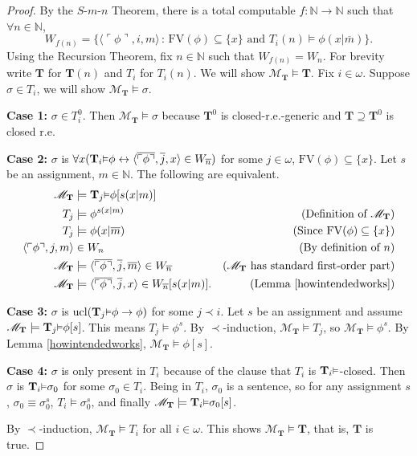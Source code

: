 \documentclass[reqno]{article}
\theoremstyle{definition}
\def\N{\mathbb{N}}
\def\M{\mathscr{M}}
\def\T{\mathbf{T}}
\def\FV{\mathrm{FV}}
\renewcommand{\Pr}[1]{\T_{#1}\mbox{\small${\vDash}$}}
\newcommand{\ucl}[1]{\mathrm{ucl}(#1)}
\newcommand{\case}[1]{\textbf{Case #1:}}
\begin{document}
\begin{proof}
By the $S$-$m$-$n$ Theorem, there is a total computable $f:\N\to\N$ such that $\forall n\in\N$,
\[
W_{f(n)}=\{\langle\ulcorner\phi\urcorner,i,m\rangle\,:\,
\mbox{$\FV(\phi)\subseteq\{x\}$ and $T_i(n)\models \phi(x|\overline m)$}\}.\]
Using the Recursion Theorem, fix $n\in\N$ such that
$W_{f(n)}=W_n$.
%
%
For brevity write $\T$ for $\T(n)$ and $T_i$ for $T_i(n)$.
We will show $\M_\T\models\T$.
Fix $i\in \omega$.
%
%
Suppose $\sigma\in T_i$, we will show $\M_\T\models\sigma$.


\item
\case1
$\sigma\in T^0_i$.
Then $\M_\T\models\sigma$ because $\T^0$ is closed-r.e.-generic and
$\T\supseteq\T^0$ is closed r.e.

\item
\case2
$\sigma$ is $\forall x(\Pr i\phi\leftrightarrow
\langle\overline{\ulcorner\phi\urcorner},\overline j,x\rangle\in W_{\overline n})$
for some $j\in\omega$, $\FV(\phi)\subseteq\{x\}$.
Let $s$ be an assignment, $m\in\N$.
The following are equivalent.
\begin{align*}
\M_{\T} &\models \Pr{j}\phi[s(x|m)]\\
T_j &\models \phi^{s(x|m)}
 &\mbox{(Definition of $\M_\T$)}\\
T_j &\models \phi(x|\overline m)
 &\mbox{(Since $\FV(\phi)\subseteq\{x\}$)}\\
\langle \ulcorner\phi\urcorner,j,m\rangle &\in W_n
 &\mbox{(By definition of $n$)}\\
\M_{\T} &\models \langle\overline{\ulcorner\phi\urcorner},\overline j,\overline m\rangle\in W_{\overline n}
 &\mbox{($\M_{\T}$ has standard first-order part)}\\
\M_{\T} &\models \langle\overline{\ulcorner\phi\urcorner},\overline j,x\rangle\in W_{\overline n}[s(x|m)].
 &\mbox{(Lemma \ref{howintendedworks})}
\end{align*}

\item
\case3
$\sigma$ is $\ucl{\Pr j\phi\rightarrow\phi}$ for some $j\prec i$.
Let $s$ be an assignment and assume $\M_\T\models\Pr j\phi[s]$.
This means $T_j\models\phi^s$.
By $\prec$-induction, 
$\M_\T\models T_j$,
so
$\M_\T\models \phi^s$.  By Lemma \ref{howintendedworks},
$\M_\T\models \phi[s]$.

\item
\case4
$\sigma$ is only present in $T_i$ because of the clause that $T_i$
is $\Pr i$-closed.
Then $\sigma$ is $\Pr i\sigma_0$ for some $\sigma_0\in T_i$.
Being in $T_i$, $\sigma_0$ is a sentence, so for any assignment $s$,
$\sigma_0\equiv\sigma^s_0$, $T_i\models\sigma^s_0$,
and finally $\M_\T\models \Pr i\sigma_0[s]$.

\item
By $\prec$-induction, $\M_\T\models T_i$ for all $i\in\omega$.
This shows $\M_\T\models\T$, that is, $\T$ is true.
\end{proof}
\end{document}
